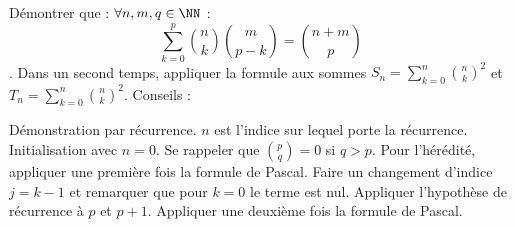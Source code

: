 %
%
	Démontrer que : $\forall n, m, q \in \NN$ :
	$$\sum\limits_{k=0}^{p}\binom{n}{k} \binom{m}{p-k} = \binom{n+m}{p}$$.  Dans un second temps, appliquer la formule aux sommes $S_n = \sum\limits_{k=0}^n \binom{n}{k}^2$ et $T_n = \sum\limits_{k=0}^n \binom{n}{k}^2$.
	Conseils :
	\begin{tasks}
		\task Démonstration par récurrence.
		\task $n$ est l'indice sur lequel porte la récurrence.
		\task Initialisation avec $n=0$. Se rappeler que $\binom{p}{q} = 0 $ si $q>p$.
		\task Pour l'hérédité, appliquer une première fois la formule de Pascal.
		\task Faire un changement d'indice $j=k-1$ et remarquer que pour $k=0$ le terme est nul.
		\task Appliquer l'hypothèse de récurrence à $p$ et $p+1$.
		\task Appliquer une deuxième fois la formule de Pascal.
	\end{tasks}

